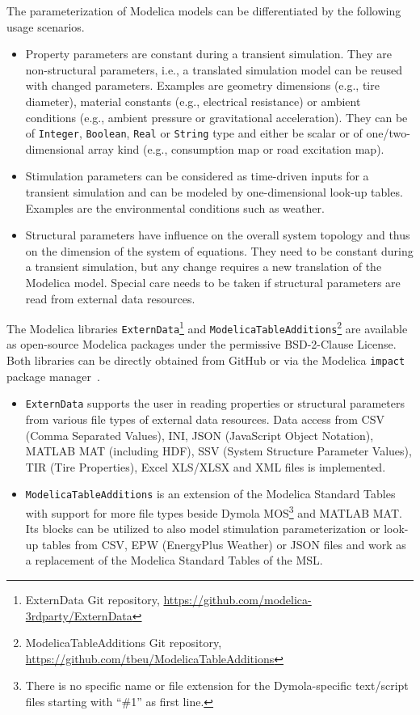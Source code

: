 \documentclass{modelica}
\newcommand{\modelica}[1]{\lstinline[language=modelica]|#1|}
\begin{document}
The parameterization of Modelica models can be differentiated by the following usage scenarios.
\begin{itemize}
 \item Property parameters are constant during a transient simulation. They are non-structural parameters, i.e., a translated simulation model can be reused with changed parameters. Examples are geometry dimensions (e.g., tire diameter), material constants (e.g., electrical resistance) or ambient conditions (e.g., ambient pressure or gravitational acceleration). They can be of \modelica{Integer}, \modelica{Boolean}, \modelica{Real} or \modelica{String} type and either be scalar or of one/two-dimensional array kind (e.g., consumption map or road excitation map).
 \item Stimulation parameters can be considered as time-driven inputs for a transient simulation and can be modeled by one-dimensional look-up tables. Examples are the environmental conditions such as weather.
 \item Structural parameters have influence on the overall system topology and thus on the dimension of the system of equations. They need to be constant during a transient simulation, but any change requires a new translation of the Modelica model. Special care needs to be taken if structural parameters are read from external data resources.
\end{itemize}

The Modelica libraries \modelica{ExternData}\footnote{ExternData Git repository, \url{https://github.com/modelica-3rdparty/ExternData}} and \modelica{ModelicaTableAdditions}\footnote{ModelicaTableAdditions Git repository, \url{https://github.com/tbeu/ModelicaTableAdditions}} are available as open-source Modelica packages under the permissive BSD-2-Clause License.
Both libraries can be directly obtained from GitHub or via the Modelica \modelica{impact} package manager~\cite{Tiller2015WhereIG}.
\begin{itemize}
 \item \modelica{ExternData} supports the user in reading properties or structural parameters from various file types of external data resources.
 Data access from CSV (Comma Separated Values), INI, JSON (JavaScript Object Notation), MATLAB MAT (including HDF), SSV (System Structure Parameter Values), TIR (Tire Properties), Excel XLS/XLSX and XML files is implemented.
 \item \modelica{ModelicaTableAdditions} is an extension of the Modelica Standard Tables~\cite{modelica2014tables} with support for more file types beside Dymola MOS\footnote{There is no specific name or file extension for the Dymola-specific text/script files starting with ``\#1'' as first line.} and MATLAB MAT.
 Its blocks can be utilized to also model stimulation parameterization or look-up tables from CSV, EPW (EnergyPlus Weather) or JSON files and work as a replacement of the Modelica Standard Tables of the MSL.
\end{itemize}
\end{document}
